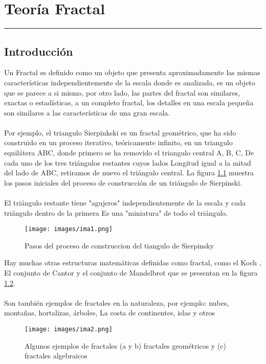 
\chapter{Teoría Fractal}
\hrule \bigskip \vspace*{1cm}



\section{Introducción}

Un Fractal es definido como un objeto que presenta aproximadamente las mismas características
independientemente de la escala donde es analizada, es un objeto que se parece a si mismo, por otro lado, las partes del fractal son similares, exactas o estadísticas, a un completo fractal, los detalles en una escala pequeña son similares a las características de una gran escala.
\\\\
Por ejemplo, el triangulo Sierpinkski es un fractal geométrico, que ha sido construido en un proceso iterativo, teóricamente infinito, en un triangulo equilátera ABC, donde primero se ha removido el triangulo central A, B, C,  De cada uno de los tres triángulos restantes cuyos lados
Longitud igual a la mitad del lado de ABC, retiramos de nuevo el triángulo central. La figura \ref{fig:ima1} muestra los pasos iniciales del proceso de construcción de un triángulo de Sierpinski.
\\\\
El triángulo restante tiene "agujeros" independientemente de la escala y cada triángulo dentro de la primera
Es una "miniatura" de todo el triángulo.

\begin{figure}[h]
\centering
\texttt{[image: images/ima1.png]}
\caption{Pasos del proceso de construccion del tiangulo de Sierpinsky}
\label{fig:ima1}
\end{figure}

Hay muchas otras estructuras matemáticas definidas como fractal, como el Koch
, El conjunto de Cantor y el conjunto de Mandelbrot que se presentan en la figura \ref{fig:ima2}.
\\\\
Son también ejemplos de fractales en la naturaleza, por ejemplo: nubes, montañas, hortalizas, árboles,
La costa de continentes, islas y otros

\begin{figure}[h]
\centering
\texttt{[image: images/ima2.png]}
\caption{Algunos ejemplos de fractales (a y b) fractales geométricos y (c) fractales algebraicos}
\label{fig:ima2}
\end{figure}


